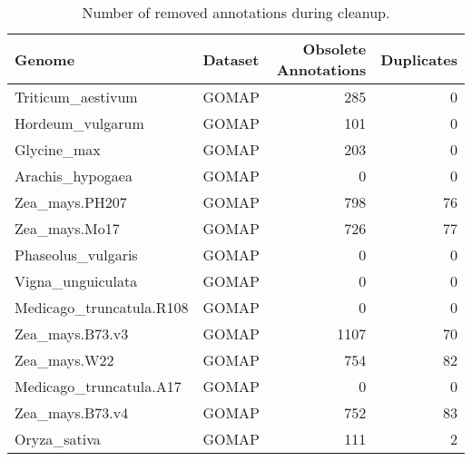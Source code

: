 \documentclass[]{article}
\begin{document}
\begin{table}[t]

\caption{\label{tab:cleanup_table}Number of removed annotations during cleanup.}
\centering
\begin{tabular}{llrr}
\toprule
Genome & Dataset & Obsolete Annotations & Duplicates\\
\midrule
\rowcolor{gray!6}  Triticum\_aestivum & GOMAP & 285 & 0\\
\cmidrule{1-4}
Hordeum\_vulgarum & GOMAP & 101 & 0\\
\cmidrule{1-4}
\rowcolor{gray!6}  Glycine\_max & GOMAP & 203 & 0\\
\cmidrule{1-4}
Arachis\_hypogaea & GOMAP & 0 & 0\\
\cmidrule{1-4}
\rowcolor{gray!6}  Zea\_mays.PH207 & GOMAP & 798 & 76\\
\cmidrule{1-4}
Zea\_mays.Mo17 & GOMAP & 726 & 77\\
\cmidrule{1-4}
\rowcolor{gray!6}  Phaseolus\_vulgaris & GOMAP & 0 & 0\\
\cmidrule{1-4}
Vigna\_unguiculata & GOMAP & 0 & 0\\
\cmidrule{1-4}
\rowcolor{gray!6}  Medicago\_truncatula.R108 & GOMAP & 0 & 0\\
\cmidrule{1-4}
Zea\_mays.B73.v3 & GOMAP & 1107 & 70\\
\cmidrule{1-4}
\rowcolor{gray!6}  Zea\_mays.W22 & GOMAP & 754 & 82\\
\cmidrule{1-4}
Medicago\_truncatula.A17 & GOMAP & 0 & 0\\
\cmidrule{1-4}
\rowcolor{gray!6}  Zea\_mays.B73.v4 & GOMAP & 752 & 83\\
\cmidrule{1-4}
Oryza\_sativa & GOMAP & 111 & 2\\
\bottomrule
\end{tabular}
\end{table}
\end{document}
